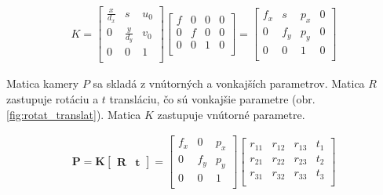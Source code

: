 \begin{equation}
\label{eq::pinhole::intrinsic}
\begin{aligned}
K=
\begin{bmatrix}
\frac{x}{d_x} & s & u_0 \\
0 & \frac{y}{d_y} & v_0 \\
0 & 0 & 1 \\
\end{bmatrix}
\begin{bmatrix}
f & 0 & 0 & 0 \\
0 & f & 0 & 0 \\
0 & 0 & 1 & 0 \\
\end{bmatrix}
=
\begin{bmatrix}
f_x & s & p_x & 0 \\
0 & f_y & p_y & 0 \\
0 & 0 & 1 & 0 \\
\end{bmatrix}
\end{aligned}
\end{equation}

Matica kamery $P$ sa skladá z vnútorných a vonkajších parametrov. Matica $R$ zastupuje rotáciu a $t$ transláciu, čo sú vonkajšie parametre (obr. \ref{fig:rotat_translat}). Matica $K$ zastupuje vnútorné parametre.

\begin{equation}
\label{eq::pinhole::p}
\begin{aligned}
\boldsymbol{P}=
\boldsymbol{
K
\begin{bmatrix}
R & t
\end{bmatrix}}=
\begin{bmatrix}
f_x & 0 & p_x \\
0 & f_y & p_y \\
0 & 0 & 1 \\
\end{bmatrix}
\begin{bmatrix}
r_{11} & r_{12} & r_{13} & t_{1} \\
r_{21} & r_{22} & r_{23} & t_{2} \\
r_{31} & r_{32} & r_{33} & t_{3} \\
\end{bmatrix}
\end{aligned}
\end{equation}

